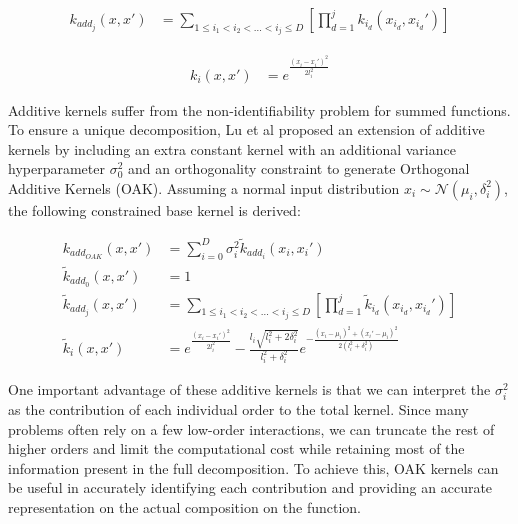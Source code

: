 \documentclass{IOS-Book-Article}
\begin{document}
	\begin{equation} \label{eq:additive2}
		\begin{aligned}
			k_{add_j}(x,x') &= \sum_{1\leq i_1 < i_2 < \ldots < i_j\leq D} \left[\prod_{d=1}^{j} k_{i_d}(x_{i_d},x_{i_d}') \right]
		\end{aligned}
	\end{equation}
	
	\begin{equation} \label{eq:additive3}
		\begin{aligned}
			k_i(x,x') &= e^{\frac{(x_i-x_i')^2}{2l_i^2}}
		\end{aligned}
	\end{equation}
	
	Additive kernels suffer from the non-identifiability problem for summed functions. To ensure a unique decomposition, Lu et al\cite{gp-additive-orthogonal} proposed an extension of additive kernels by including an extra constant kernel with an additional variance hyperparameter $\sigma_0^2$ and an orthogonality constraint to generate Orthogonal Additive Kernels (OAK)\cite{gp-additive-orthogonal}. Assuming a normal input distribution $x_i \sim \mathcal{N}(\mu_i, \delta_i^2)$, the following constrained base kernel is derived:
	
	\begin{equation} \label{eq:additive-orthogonal}
		\begin{aligned}
			k_{add_{OAK}}(x,x') &= \sum_{i=0}^D{\sigma_i^2  \tilde{k}_{add_i}(x_i,x_i')} \\
			\tilde{k}_{add_0}(x,x') &= 1\\
			\tilde{k}_{add_j}(x,x') &= \sum_{1\leq i_1 < i_2 < \ldots < i_j\leq D} \left[\prod_{d=1}^{j} \tilde{k}_{i_d}(x_{i_d},x_{i_d}') \right]\\		
			\tilde{k}_i(x,x') &= e^{\frac{(x_i-x_i')^2}{2l_i^2}} - \frac{l_i\sqrt{l_i^2 + 2\delta_i^2}}{l_i^2 + \delta_i^2} e^{-\frac{(x_i-\mu_i)^2 + (x_i'-\mu_i)^2}{2(l_i^2 + \delta_i^2)}}
		\end{aligned}
	\end{equation}
	
	One important advantage of these additive kernels is that we can interpret the $\sigma_i^2$ as the contribution of each individual order to the total kernel. Since many problems often rely on a few low-order interactions, we can truncate the rest of higher orders and limit the computational cost while retaining most of the information present in the full decomposition. To achieve this, OAK kernels can be useful in accurately identifying each contribution and providing an accurate representation on the actual composition on the function.
	
\end{document}

